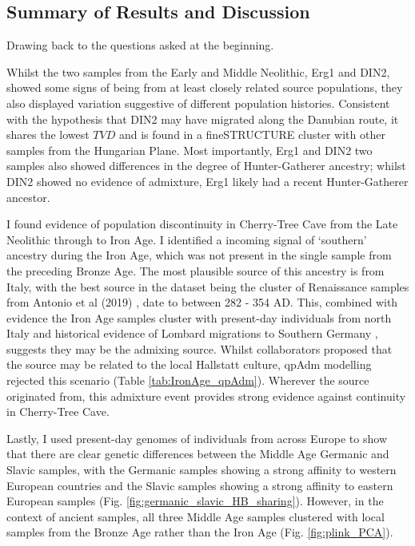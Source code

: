 \subsection{Summary of Results and Discussion}

Drawing back to the questions asked at the beginning.

Whilst the two samples from the Early and Middle Neolithic, Erg1 and DIN2, showed some signs of being from at least closely related source populations, they also displayed variation suggestive of different population histories. Consistent with the hypothesis that DIN2 may have migrated along the Danubian route, it shares the lowest $TVD$ and is found in a fineSTRUCTURE cluster with other samples from the Hungarian Plane. Most importantly, Erg1 and DIN2 two samples also showed differences in the degree of Hunter-Gatherer ancestry; whilst DIN2 showed no evidence of admixture, Erg1 likely had a recent Hunter-Gatherer ancestor.

I found evidence of population discontinuity in Cherry-Tree Cave from the Late Neolithic through to Iron Age. I identified a incoming signal of `southern' ancestry during the Iron Age, which was not present in the single sample from the preceding Bronze Age. The most plausible source of this ancestry is from Italy, with the best source in the dataset being the cluster of Renaissance samples from Antonio et al (2019) \cite{antonio2019ancient}, date to between 282 - 354 AD. This, combined with evidence the Iron Age samples cluster with present-day individuals from north Italy and historical evidence of Lombard migrations to Southern Germany \cite{wegewitz1972}, suggests they may be the admixing source. Whilst collaborators proposed that the source may be related to the local Hallstatt culture, qpAdm modelling rejected this scenario (Table \ref{tab:IronAge_qpAdm}). Wherever the source originated from, this admixture event provides strong evidence against continuity in Cherry-Tree Cave. 

Lastly, I used present-day genomes of individuals from across Europe to show that there are clear genetic differences between the Middle Age Germanic and Slavic samples, with the Germanic samples showing a strong affinity to western European countries and the Slavic samples showing a strong affinity to eastern European samples (Fig. \ref{fig:germanic_slavic_HB_sharing}). However, in the context of ancient samples, all three Middle Age samples clustered with local samples from the Bronze Age rather than the Iron Age (Fig. \ref{fig:plink_PCA}). 

